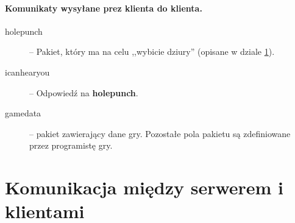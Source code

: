 \documentclass[a4paper, 12pt]{article}
\begin{document}
\paragraph{Komunikaty wysyłane prez klienta do klienta.}
\begin{description}
 \item[holepunch] -- Pakiet, który ma na celu ,,wybicie dziury'' (opisane w dziale \ref{sec:komunikacja}).
 \item[icanhearyou] -- Odpowiedź na \textbf{holepunch}.
 \item[gamedata] -- pakiet zawierający dane gry. Pozostałe pola pakietu są zdefiniowane przez programistę gry.
\end{description}
 

\section{Komunikacja między serwerem i klientami}
\label{sec:komunikacja}
\end{document}

